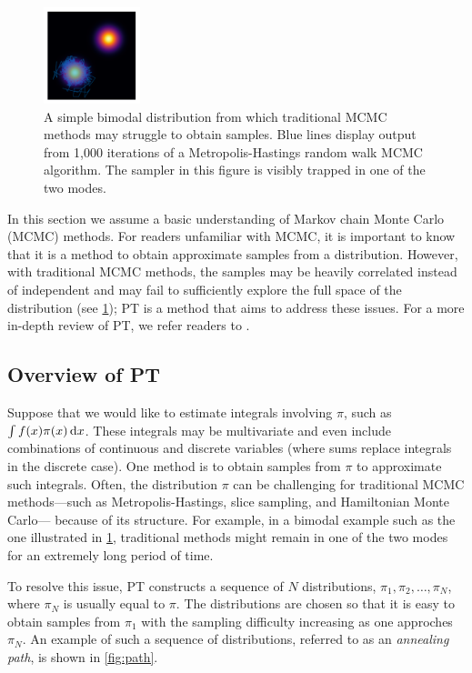 \begin{figure}[t]
    \centering
    \includegraphics[width=0.25\textwidth]{../img/bimodal.pdf}
    \caption{A simple bimodal distribution from which traditional 
    MCMC methods may struggle to obtain samples. Blue lines display output 
    from 1,000 iterations of a Metropolis-Hastings random walk MCMC algorithm.
    The sampler in this figure is visibly trapped in one of the two modes.}
    \label{fig:bimodal}
\end{figure}


In this section we assume a basic understanding of 
Markov chain Monte Carlo (MCMC) methods.
For readers unfamiliar with MCMC, it is important to know that 
it is a method to obtain approximate samples from a distribution. 
However, with traditional 
MCMC methods, the samples may be heavily correlated instead of independent 
and may fail to sufficiently explore the 
full space of the distribution (see \cref{fig:bimodal}); 
PT is a method that aims to address these issues.
For a more in-depth review of PT, we refer readers to \citet{surjanovic2022vpt}.


\subsection{Overview of PT}
Suppose that we would like to estimate integrals involving $\pi$, such as 
$\int f(x) \pi(x) \, \mathrm{d} x$. 
These integrals may be multivariate and even include combinations of 
continuous and discrete variables (where sums replace integrals in the discrete 
case).
One method is to obtain samples from $\pi$ to approximate such integrals.
Often, the distribution 
$\pi$ can be challenging for traditional MCMC methods---such 
as Metropolis-Hastings, slice sampling, and Hamiltonian Monte Carlo---
because of its structure.
For example, in a bimodal example such as the one illustrated in 
\cref{fig:bimodal},
traditional methods might remain in one of the two modes for an extremely 
long period of time.



To resolve this issue, PT constructs a sequence of $N$ distributions,  
$\pi_1, \pi_2, \ldots, \pi_N$, where $\pi_N$ is usually equal to $\pi$.
The distributions are chosen so that it is easy to obtain samples from $\pi_1$
with the sampling difficulty increasing as one approches $\pi_N$. An example 
of such a sequence of distributions, referred to as an \textit{annealing path},
is shown in \cref{fig:path}.



